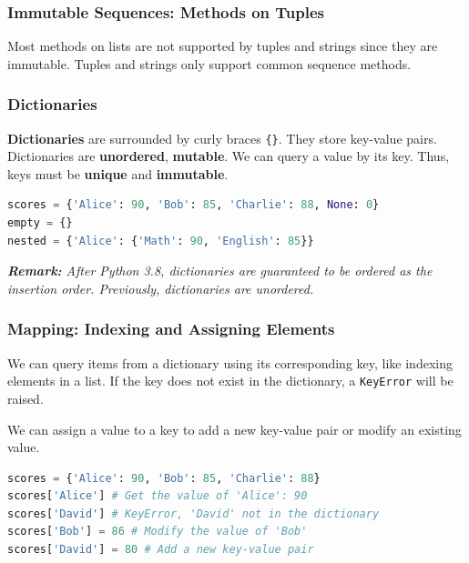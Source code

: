 \documentclass[beamer, en, version=2.0]{huangfusl-template}
\begin{document}
    \begin{frame}[fragile]
        \frametitle{Immutable Sequences: Methods on Tuples}

        Most methods on lists are not supported by tuples and strings since they are immutable. Tuples and strings only support common sequence methods.
    \end{frame}
    \begin{frame}[fragile]
        \frametitle{Dictionaries}

        \textbf{Dictionaries} are surrounded by curly braces {\footnotesize\verb|{}|}. They store key-value pairs. Dictionaries are \textbf{unordered}, \textbf{mutable}. We can query a value by its key. Thus, keys must be \textbf{unique} and \textbf{immutable}.

\begin{lstlisting}[language=python]
scores = {'Alice': 90, 'Bob': 85, 'Charlie': 88, None: 0}
empty = {}
nested = {'Alice': {'Math': 90, 'English': 85}}
\end{lstlisting}

        {\footnotesize\itshape\textbf{Remark:} After Python 3.8, dictionaries are guaranteed to be ordered as the insertion order. Previously, dictionaries are unordered.}
    \end{frame}
    \begin{frame}[fragile]
        \frametitle{Mapping: Indexing and Assigning Elements}

        We can query items from a dictionary using its corresponding key, like indexing elements in a list. If the key does not exist in the dictionary, a {\footnotesize\verb|KeyError|} will be raised.

        We can assign a value to a key to add a new key-value pair or modify an existing value.

\begin{lstlisting}[language=python]
scores = {'Alice': 90, 'Bob': 85, 'Charlie': 88}
scores['Alice'] # Get the value of 'Alice': 90
scores['David'] # KeyError, 'David' not in the dictionary
scores['Bob'] = 86 # Modify the value of 'Bob'
scores['David'] = 80 # Add a new key-value pair
\end{lstlisting}

    \end{frame}
\end{document}
